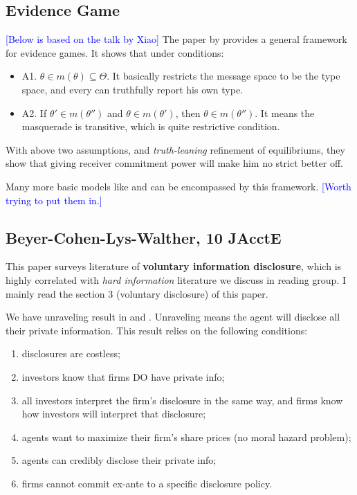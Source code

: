 \documentclass{book}
\theoremstyle{plain}
\theoremstyle{definition}
\begin{document}
\subsection{Evidence Game} %
\label{sub:evidence_game}

\textcolor{blue}{[Below is based on the talk by Xiao]}
The paper by \cite{Hart_et:17aer_evidence_games} provides a general framework for evidence games. It shows that under conditions:
\begin{itemize}
	\item A1. $\theta \in m(\theta) \subseteq \Theta$.
	It basically restricts the message space to be the type space, and every can truthfully report his own type.
	\item A2. If $\theta' \in m(\theta'')$ and $\theta \in m(\theta')$, then $\theta \in m(\theta'')$. It means the masquerade is transitive, which is quite restrictive condition.
\end{itemize}
With above two assumptions, and \textit{truth-leaning} refinement of equilibriums, they show that giving receiver commitment power will make him no strict better off.

Many more basic models like \cite{Dye:1985a} and \cite{Milgrom:1981dv} can be encompassed by this framework. \textcolor{blue}{[Worth trying to put them in.]}




\subsection{Beyer-Cohen-Lys-Walther, 10 JAcctE} %
\label{sub:beyer_cohen_lys_Walther_10_jaccte}

\textbf{}

This paper surveys literature of \textbf{voluntary information disclosure}, which is highly correlated with \textit{hard information} literature we discuss in reading group. I mainly read the section 3 (voluntary disclosure) of this paper.

We have unraveling result in \cite{Milgrom:1981dv} and \cite{Grossman:1981ih}. Unraveling means the agent will disclose all their private information. This result relies on the following conditions:
\begin{enumerate}
	\setlength{\itemsep}{0pt}
	\item disclosures are costless;
	\item investors know that firms DO have private info;
	\item all investors interpret the firm's disclosure in the same way, and firms know how investors will interpret that disclosure;
	\item agents want to maximize their firm's share prices (no moral hazard problem);
	\item agents can credibly disclose their private info;
	\item firms cannot commit ex-ante to a specific disclosure policy.
\end{enumerate}
\end{document}
